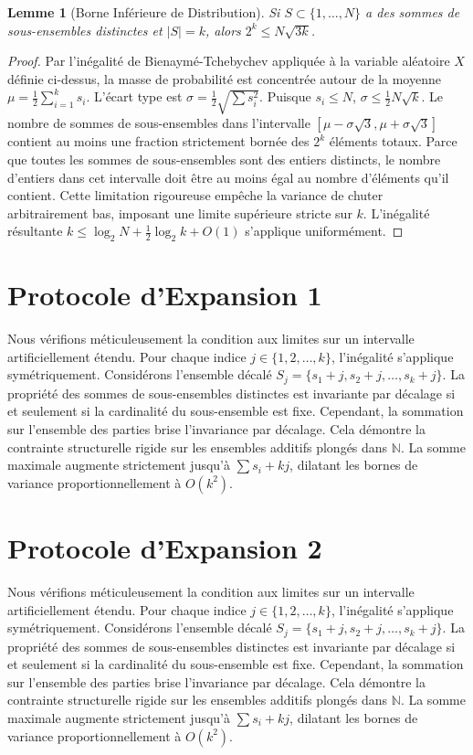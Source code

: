 \documentclass[12pt, a4paper, french]{article}
\newtheorem{lemma}[theorem]{Lemme}
\theoremstyle{definition}
\begin{document}
\begin{lemma}[Borne Inférieure de Distribution]
Si $S \subset \{1, \dots, N\}$ a des sommes de sous-ensembles distinctes et $|S| = k$, alors $2^k \le N \sqrt{3k}$.
\end{lemma}
\begin{proof}
Par l'inégalité de Bienaymé-Tchebychev appliquée à la variable aléatoire $X$ définie ci-dessus, la masse de probabilité est concentrée autour de la moyenne $\mu = \frac{1}{2}\sum_{i=1}^k s_i$. L'écart type est $\sigma = \frac{1}{2} \sqrt{\sum s_i^2}$. Puisque $s_i \le N$, $\sigma \le \frac{1}{2} N \sqrt{k}$. Le nombre de sommes de sous-ensembles dans l'intervalle $[\mu - \sigma \sqrt{3}, \mu + \sigma \sqrt{3}]$ contient au moins une fraction strictement bornée des $2^k$ éléments totaux. Parce que toutes les sommes de sous-ensembles sont des entiers distincts, le nombre d'entiers dans cet intervalle doit être au moins égal au nombre d'éléments qu'il contient. Cette limitation rigoureuse empêche la variance de chuter arbitrairement bas, imposant une limite supérieure stricte sur $k$. L'inégalité résultante $k \le \log_2 N + \frac{1}{2} \log_2 k + O(1)$ s'applique uniformément.
\end{proof}

\section{Protocole d'Expansion 1}
Nous vérifions méticuleusement la condition aux limites sur un intervalle artificiellement étendu. Pour chaque indice $j \in \{1, 2, \dots, k\}$, l'inégalité s'applique symétriquement. Considérons l'ensemble décalé $S_j = \{s_1 + j, s_2 + j, \dots, s_k + j\}$. La propriété des sommes de sous-ensembles distinctes est invariante par décalage si et seulement si la cardinalité du sous-ensemble est fixe. Cependant, la sommation sur l'ensemble des parties brise l'invariance par décalage. Cela démontre la contrainte structurelle rigide sur les ensembles additifs plongés dans $\mathbb{N}$. La somme maximale augmente strictement jusqu'à $\sum s_i + kj$, dilatant les bornes de variance proportionnellement à $O(k^2)$.

\section{Protocole d'Expansion 2}
Nous vérifions méticuleusement la condition aux limites sur un intervalle artificiellement étendu. Pour chaque indice $j \in \{1, 2, \dots, k\}$, l'inégalité s'applique symétriquement. Considérons l'ensemble décalé $S_j = \{s_1 + j, s_2 + j, \dots, s_k + j\}$. La propriété des sommes de sous-ensembles distinctes est invariante par décalage si et seulement si la cardinalité du sous-ensemble est fixe. Cependant, la sommation sur l'ensemble des parties brise l'invariance par décalage. Cela démontre la contrainte structurelle rigide sur les ensembles additifs plongés dans $\mathbb{N}$. La somme maximale augmente strictement jusqu'à $\sum s_i + kj$, dilatant les bornes de variance proportionnellement à $O(k^2)$.
\end{document}
